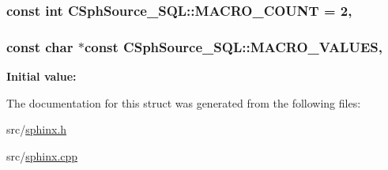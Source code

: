 \hypertarget{structCSphSource__SQL_a6c0988492c5ee4c7eed91719640f9cbd}{
\subsubsection[{M\-A\-C\-R\-O\-\_\-\-C\-O\-U\-N\-T}]{\setlength{\rightskip}{0pt plus 5cm}const {\bf int} C\-Sph\-Source\-\_\-\-S\-Q\-L\-::\-M\-A\-C\-R\-O\-\_\-\-C\-O\-U\-N\-T = 2\hspace{0.3cm}{\ttfamily [static]}, {\ttfamily [protected]}}}\label{structCSphSource__SQL_a6c0988492c5ee4c7eed91719640f9cbd}
\hypertarget{structCSphSource__SQL_a59789aa6096ddbf99c4b570123b470ac}{
\subsubsection[{M\-A\-C\-R\-O\-\_\-\-V\-A\-L\-U\-E\-S}]{\setlength{\rightskip}{0pt plus 5cm}const char $\ast$const C\-Sph\-Source\-\_\-\-S\-Q\-L\-::\-M\-A\-C\-R\-O\-\_\-\-V\-A\-L\-U\-E\-S\hspace{0.3cm}{\ttfamily [static]}, {\ttfamily [protected]}}}\label{structCSphSource__SQL_a59789aa6096ddbf99c4b570123b470ac}
{\bfseries Initial value\-:}
\begin{DoxyCode}
=
\{
    \textcolor{stringliteral}{"$start"},
    \textcolor{stringliteral}{"$end"}
\}
\end{DoxyCode}


The documentation for this struct was generated from the following files\-:\begin{DoxyCompactItemize}
\item 
src/\hyperlink{sphinx_8h}{sphinx.\-h}\item 
src/\hyperlink{sphinx_8cpp}{sphinx.\-cpp}\end{DoxyCompactItemize}
